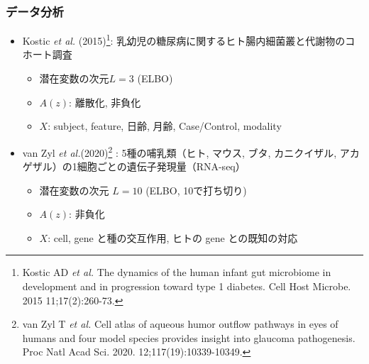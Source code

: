 \documentclass[dvipdfmx, dvipsnames]{beamer}
\begin{document}

\begin{frame}
\frametitle{データ分析}
\begin{itemize}
\item Kostic \textit{et al.} (2015)\footnote{Kostic AD \textit{et al.} The dynamics of the human infant gut microbiome in development and in progression toward type 1 diabetes. Cell Host Microbe. 2015 11;17(2):260-73.}: 乳幼児の糖尿病に関するヒト腸内細菌叢と代謝物のコホート調査
\begin{itemize}
\item 潜在変数の次元$L=3$ (ELBO)
\item $A(z)$: 離散化, 非負化
\item $X$: subject, feature, 日齢, 月齢, Case/Control, modality
\end{itemize}
\end{itemize}

\begin{itemize}
\item van Zyl \textit{et al.}(2020)\footnote{van Zyl T \textit{et al.} Cell atlas of aqueous humor outflow pathways in eyes of humans and four model species provides insight into glaucoma pathogenesis. Proc Natl Acad Sci. 2020. 12;117(19):10339-10349.} : 5種の哺乳類（ヒト, マウス, ブタ, カニクイザル, アカゲザル）の1細胞ごとの遺伝子発現量（RNA-seq）
\begin{itemize}
\item 潜在変数の次元 $L=10$  (ELBO, 10で打ち切り)
\item $A(z)$: 非負化
\item $X$: cell, gene と種の交互作用, ヒトの gene との既知の対応
\end{itemize}
\end{itemize}
\end{frame}
\end{document}
